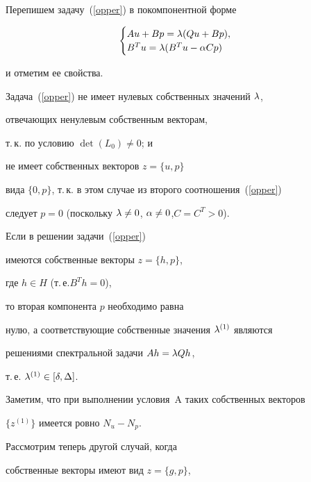 \begin{pf}


Перепишем задачу~(\ref{opper}) в покомпонентной форме


$$


\begin{cases}


A  u + B p = \zl ( Q u + B  p), \\


B^T u = \zl ( B^T u - \za C p)


\end{cases}


$$


и отметим ее свойства.





Задача~(\ref{opper}) не имеет нулевых собственных значений $\lambda$,


отвечающих ненулевым собственным векторам,


т.\,к. по условию $\det (L_{0}) \neq 0$; и


не имеет собственных векторов $z=\{u,p\}$


вида $\{0,p\}$, т.\,к. в этом случае из второго соотношения~(\ref{opper})


следует $p=0$ (поскольку $\lambda \neq 0$, $\alpha \neq 0$,\linebreak $C = C^T>0$).





Если в решении задачи~(\ref{opper}) 


имеются собственные векторы $z=\{h,p\}$,


где $h \in H$ (т.\,е.\linebreak $B^Th=0$), 


то вторая компонента $p$ необходимо равна


нулю, а соответствующие собственные значения $\lambda^{(1)}$ являются


решениями спектральной задачи $A h = \lambda Q h$,


т.\,е. $\lambda^{(1)} \in [\delta,\Delta]$.


Заметим, что при выполнении условия~A таких собственных векторов


$\{z^{(1)}\}$ имеется ровно $N_u - N_p$.





Рассмотрим теперь другой случай, когда


собственные векторы имеют вид $z=\{g,p\}$,



\end{pf}

